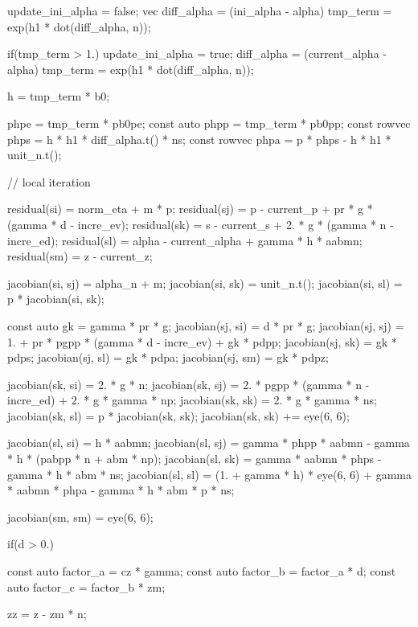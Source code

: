 \begin{cppcode}
{{        update_ini_alpha = false;
        vec diff_alpha = (ini_alpha - alpha) %
        tmp_term = exp(h1 * dot(diff_alpha, n));

        if(tmp_term > 1.) {
            update_ini_alpha = true;
            diff_alpha = (current_alpha - alpha) %
            tmp_term = exp(h1 * dot(diff_alpha, n));
        }

        h = tmp_term * b0;

        phpe = tmp_term * pb0pe;
        const auto phpp = tmp_term * pb0pp;
        const rowvec phps = h * h1 * diff_alpha.t() * ns;
        const rowvec phpa = p * phps - h * h1 * unit_n.t();

        // local iteration

        residual(si) = norm_eta + m * p;
        residual(sj) = p - current_p + pr * g * (gamma * d - incre_ev);
        residual(sk) = s - current_s + 2. * g * (gamma * n - incre_ed);
        residual(sl) = alpha - current_alpha + gamma * h * aabmn;
        residual(sm) = z - current_z;

        jacobian(si, sj) = alpha_n + m;
        jacobian(si, sk) = unit_n.t();
        jacobian(si, sl) = p * jacobian(si, sk);

        const auto gk = gamma * pr * g;
        jacobian(sj, si) = d * pr * g;
        jacobian(sj, sj) = 1. + pr * pgpp * (gamma * d - incre_ev) + gk * pdpp;
        jacobian(sj, sk) = gk * pdps;
        jacobian(sj, sl) = gk * pdpa;
        jacobian(sj, sm) = gk * pdpz;

        jacobian(sk, si) = 2. * g * n;
        jacobian(sk, sj) = 2. * pgpp * (gamma * n - incre_ed) + 2. * g * gamma * np;
        jacobian(sk, sk) = 2. * g * gamma * ns;
        jacobian(sk, sl) = p * jacobian(sk, sk);
        jacobian(sk, sk) += eye(6, 6);

        jacobian(sl, si) = h * aabmn;
        jacobian(sl, sj) = gamma * phpp * aabmn - gamma * h * (pabpp * n + abm * np);
        jacobian(sl, sk) = gamma * aabmn * phps - gamma * h * abm * ns;
        jacobian(sl, sl) = (1. + gamma * h) * eye(6, 6) + gamma * aabmn * phpa - gamma * h * abm * p * ns;

        jacobian(sm, sm) = eye(6, 6);

        if(d > 0.) {
            const auto factor_a = cz * gamma;
            const auto factor_b = factor_a * d;
            const auto factor_c = factor_b * zm;

            zz = z - zm * n;

}}}
\end{cppcode}
